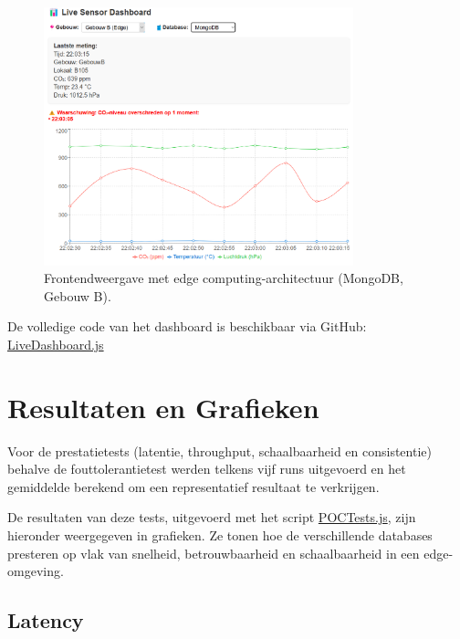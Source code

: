 \begin{figure}[H]
    \centering
    \includegraphics[width=0.8\textwidth]{GebouwB_MongoDb_Website.png}
    \caption{Frontendweergave met edge computing-architectuur (MongoDB, Gebouw B).}
    \label{fig:gebouw-b-architecture}
\end{figure}

De volledige code van het dashboard is beschikbaar via GitHub: \\
\href{https://github.com/WoutVC/sensor-dashboard/blob/master/src/components/LiveDashboard.js}{LiveDashboard.js}

\section{Resultaten en Grafieken}
Voor de prestatietests (latentie, throughput, schaalbaarheid en consistentie) behalve de fouttolerantietest werden telkens vijf runs uitgevoerd en het gemiddelde berekend om een representatief resultaat te verkrijgen.

De resultaten van deze tests, uitgevoerd met het script \href{https://github.com/WoutVC/bachelorproef2024/blob/main/proof_of_concept/backend/POCTests.js}{POCTests.js},
 zijn hieronder weergegeven in grafieken. Ze tonen hoe de verschillende databases presteren op vlak van snelheid, betrouwbaarheid en schaalbaarheid in een edge-omgeving.
\subsection{Latency}

